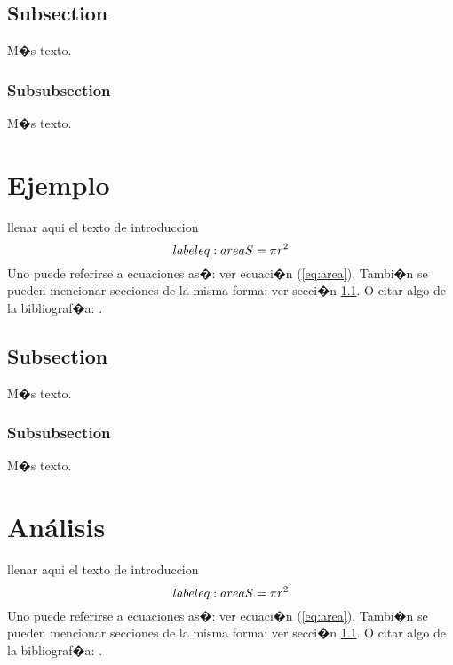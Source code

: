 \documentclass{article}
\theoremstyle{definition}
\theoremstyle{remark}
\begin{document}
\subsection{Subsection}\label{sec:nada}

M�s texto.

\subsubsection{Subsubsection}\label{sec:nada2}

M�s texto.





\section{Ejemplo}

llenar aqui el texto de introduccion
\begin{equation}\\label{eq:area}
  S = \pi r^2
\end{equation}
Uno puede referirse a ecuaciones as�: ver ecuaci�n (\ref{eq:area}).
Tambi�n se pueden mencionar secciones de la misma forma: ver secci�n
\ref{sec:nada}. O citar algo de la bibliograf�a: \cite{Cd94}.

\subsection{Subsection}\label{sec:nada}

M�s texto.

\subsubsection{Subsubsection}\label{sec:nada2}

M�s texto.




\section{An\'alisis}

llenar aqui el texto de introduccion
\begin{equation}\\label{eq:area}
  S = \pi r^2
\end{equation}
Uno puede referirse a ecuaciones as�: ver ecuaci�n (\ref{eq:area}).
Tambi�n se pueden mencionar secciones de la misma forma: ver secci�n
\ref{sec:nada}. O citar algo de la bibliograf�a: \cite{Cd94}.
\end{document}
